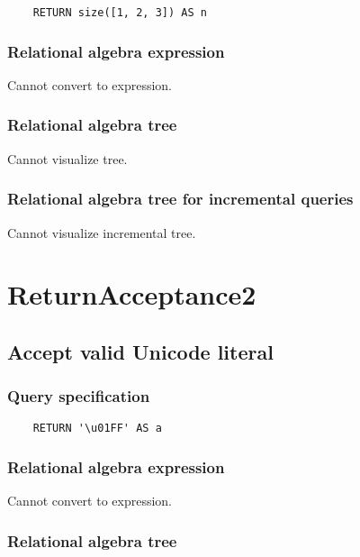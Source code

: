 	\begin{lstlisting}
	RETURN size([1, 2, 3]) AS n
	\end{lstlisting}


	\subsubsection*{Relational algebra expression}

	Cannot convert to expression.

	\subsubsection*{Relational algebra tree}

	Cannot visualize tree.

	\subsubsection*{Relational algebra tree for incremental queries}

	Cannot visualize incremental tree.

	\section{ReturnAcceptance2}

	\subsection{Accept valid Unicode literal}

	\subsubsection*{Query specification}

	\begin{lstlisting}
	RETURN '\u01FF' AS a
	\end{lstlisting}


	\subsubsection*{Relational algebra expression}

	Cannot convert to expression.

	\subsubsection*{Relational algebra tree}

